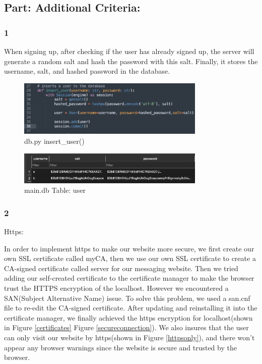 \documentclass[12pt]{article}
\begin{document}
    \subsection*{Part: Additional Criteria:}

        \subsubsection*{1} When signing up, after checking if the user has already signed up, the server will generate a random salt and hash the password with this salt. Finally, it stores the username, salt, and hashed password in the database.

        \begin{figure}[H]
            \centering
            \includegraphics[width=0.8\textwidth]{graphs/insert_user.jpg}
            \caption{db.py insert\_user()}
        \end{figure}

        \begin{figure}[H]
            \centering
            \includegraphics[width=0.8\textwidth]{graphs/hashed_passwd.jpg}
            \caption{main.db Table: user}
        \end{figure}

	\subsubsection*{2}Https:


In order to implement https to make our website more secure, we first create our own SSL certificate called myCA, then we use our own SSL certificate to create a CA-signed certificate called server for our messaging website. Then we tried adding our self-created certificate to the certificate manager to make the browser trust the HTTPS encryption of the localhost. However we encountered a SAN(Subject Alternative Name) issue. To solve this problem, we used a san.cnf file to re-edit the CA-signed certificate. After updating and reinstalling it into the certificate manager, we finally achieved the https encryption for localhost(shown in Figure \ref{certificates} Figure \ref{secureconnection}). We also insures that the user can only visit our website by https(shown in Figure \ref{httpsonly}), and there won't appear any browser warnings since the website is secure and trusted by the browser.
\end{document}
